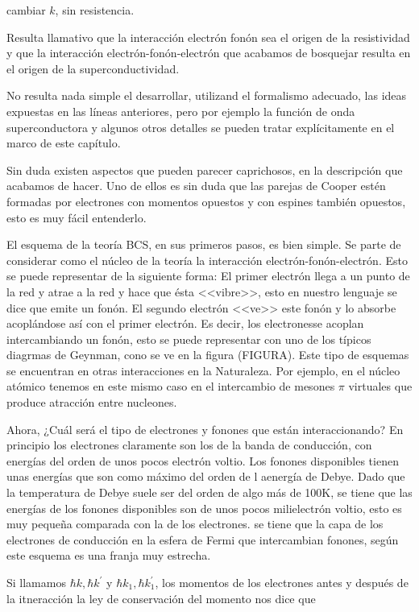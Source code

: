 cambiar $k$, sin resistencia.

Resulta llamativo que la interacción electrón fonón sea el origen de la resistividad y que la interacción electrón-fonón-electrón que acabamos de bosquejar resulta en el origen de la superconductividad.

No resulta nada simple el desarrollar, utilizand el formalismo adecuado, las ideas expuestas en las líneas anteriores, pero por ejemplo la función de onda superconductora y algunos otros detalles se pueden tratar explícitamente en el marco de este capítulo.

Sin duda existen aspectos que pueden parecer caprichosos, en la descripción que acabamos de hacer. Uno de ellos es sin duda que las parejas de Cooper estén formadas por electrones con momentos opuestos y con espines también opuestos, esto es muy fácil entenderlo.

El esquema de la teoría BCS, en sus primeros pasos, es bien simple. Se parte de considerar como el núcleo de la teoría la interacción electrón-fonón-electrón. Esto se puede representar de la siguiente forma: El primer electrón llega a un punto de la red y atrae a la red y hace que ésta <<vibre>>, esto en nuestro lenguaje se dice que emite un fonón. El segundo electrón <<ve>> este fonón y lo absorbe acoplándose así con el primer electrón. Es decir, los electronesse acoplan intercambiando un fonón, esto se puede representar con uno de los típicos diagrmas de Geynman, cono se ve en la figura (FIGURA). Este tipo de esquemas se encuentran en otras interacciones en la Naturaleza. Por ejemplo, en el núcleo atómico tenemos en este mismo caso en el intercambio de mesones $\pi$ virtuales que produce atracción entre nucleones.

Ahora, ¿Cuál será el tipo de electrones y fonones que están interaccionando? En principio los electrones claramente son los de la banda de conducción, con energías del orden de unos pocos electrón voltio. Los fonones disponibles tienen unas energías que son como máximo del orden de l aenergía de Debye. Dado que la temperatura de Debye suele ser del orden de algo más de 100K, se tiene que las energías de los fonones disponibles son de unos pocos milielectrón voltio, esto es muy pequeña comparada con la de los electrones. se tiene que la capa de los electrones de conducción en la esfera de Fermi que intercambian fonones, según este esquema es una franja muy estrecha.


Si llamamos $\hbar k, \hbar k^\prime$ y $\hbar k_1, \hbar k_1^\prime$, los momentos de los electrones antes y después de la itneracción la ley de conservación del momento nos dice que

